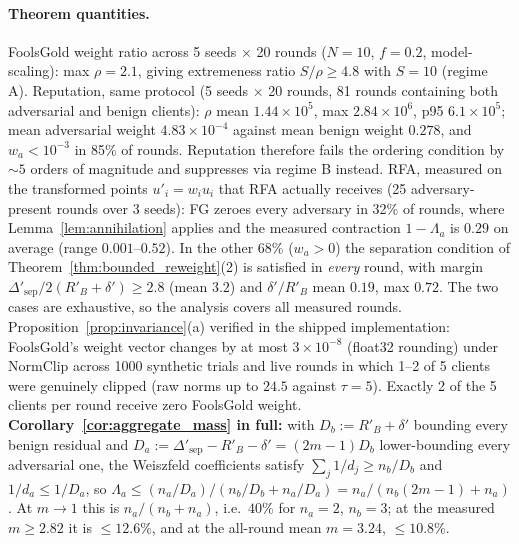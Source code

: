 \documentclass{article}
\begin{document}
\paragraph{Theorem quantities.} FoolsGold weight ratio across 5 seeds $\times$ 20 rounds ($N{=}10$, $f{=}0.2$, model-scaling): max $\rho = 2.1$, giving extremeness ratio $S/\rho \geq 4.8$ with $S{=}10$ (regime A). Reputation, same protocol (5 seeds $\times$ 20 rounds, 81 rounds containing both adversarial and benign clients): $\rho$ mean $1.44{\times}10^{5}$, max $2.84{\times}10^{6}$, p95 $6.1{\times}10^{5}$; mean adversarial weight $4.83{\times}10^{-4}$ against mean benign weight $0.278$, and $w_a < 10^{-3}$ in 85\% of rounds. Reputation therefore fails the ordering condition by ${\sim}5$ orders of magnitude and suppresses via regime B instead. RFA, measured on the transformed points $u'_i = w_i u_i$ that RFA actually receives (25 adversary-present rounds over 3 seeds): FG zeroes every adversary in 32\% of rounds, where Lemma~\ref{lem:annihilation} applies and the measured contraction $1-\Lambda_a$ is $0.29$ on average (range $0.001$--$0.52$). In the other 68\% ($w_a > 0$) the separation condition of Theorem~\ref{thm:bounded_reweight}(2) is satisfied in \emph{every} round, with margin $\Delta'_{\mathrm{sep}}/2(R'_B{+}\delta') \geq 2.8$ (mean $3.2$) and $\delta'/R'_B$ mean $0.19$, max $0.72$. The two cases are exhaustive, so the analysis covers all measured rounds. Proposition~\ref{prop:invariance}(a) verified in the shipped implementation: FoolsGold's weight vector changes by at most $3\times 10^{-8}$ (float32 rounding) under NormClip across 1000 synthetic trials and live rounds in which 1--2 of 5 clients were genuinely clipped (raw norms up to $24.5$ against $\tau{=}5$). Exactly 2 of the 5 clients per round receive zero FoolsGold weight. \textbf{Corollary~\ref{cor:aggregate_mass} in full:} with $D_b := R'_B+\delta'$ bounding every benign residual and $D_a := \Delta'_{\mathrm{sep}}-R'_B-\delta' = (2m-1)D_b$ lower-bounding every adversarial one, the Weiszfeld coefficients satisfy $\sum_j 1/d_j \geq n_b/D_b$ and $1/d_a \leq 1/D_a$, so $\Lambda_a \leq (n_a/D_a)/(n_b/D_b + n_a/D_a) = n_a/(n_b(2m-1)+n_a)$. At $m\to1$ this is $n_a/(n_b+n_a)$, i.e.\ $40\%$ for $n_a{=}2$, $n_b{=}3$; at the measured $m \geq 2.82$ it is $\leq 12.6\%$, and at the all-round mean $m = 3.24$, $\leq 10.8\%$.
\end{document}
